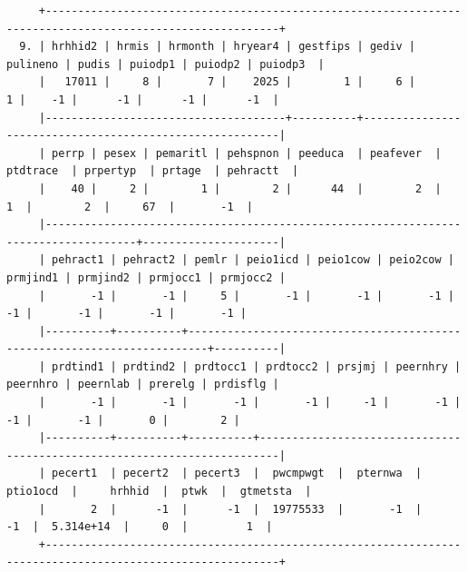 \documentclass[
]{book}
\begin{document}
\begin{verbatim}
     +----------------------------------------------------------------------------------------------------------+
  9. | hrhhid2 | hrmis | hrmonth | hryear4 | gestfips | gediv | pulineno | pudis | puiodp1 | puiodp2 | puiodp3  |
     |   17011 |     8 |       7 |    2025 |        1 |     6 |        1 |    -1 |      -1 |      -1 |      -1  |
     |-------------------------------------+----------+---------------------------------------------------------|
     | perrp | pesex | pemaritl | pehspnon | peeduca  | peafever  | ptdtrace  | prpertyp  | prtage  | pehractt  |
     |    40 |     2 |        1 |        2 |      44  |        2  |        1  |        2  |     67  |       -1  |
     |------------------------------------------------------------------------------------+---------------------|
     | pehract1 | pehract2 | pemlr | peio1icd | peio1cow | peio2cow | prmjind1 | prmjind2 | prmjocc1 | prmjocc2 |
     |       -1 |       -1 |     5 |       -1 |       -1 |       -1 |       -1 |       -1 |       -1 |       -1 |
     |----------+----------+-------------------------------------------------------------------------+----------|
     | prdtind1 | prdtind2 | prdtocc1 | prdtocc2 | prsjmj | peernhry | peernhro | peernlab | prerelg | prdisflg |
     |       -1 |       -1 |       -1 |       -1 |     -1 |       -1 |       -1 |       -1 |       0 |        2 |
     |----------+----------+----------+-------------------------------------------------------------------------|
     | pecert1  | pecert2  | pecert3  |  pwcmpwgt  |  pternwa  |  ptio1ocd  |     hrhhid  |  ptwk  |  gtmetsta  |
     |       2  |      -1  |      -1  |  19775533  |       -1  |        -1  |  5.314e+14  |     0  |         1  |
     +----------------------------------------------------------------------------------------------------------+


\end{verbatim}
\end{document}
